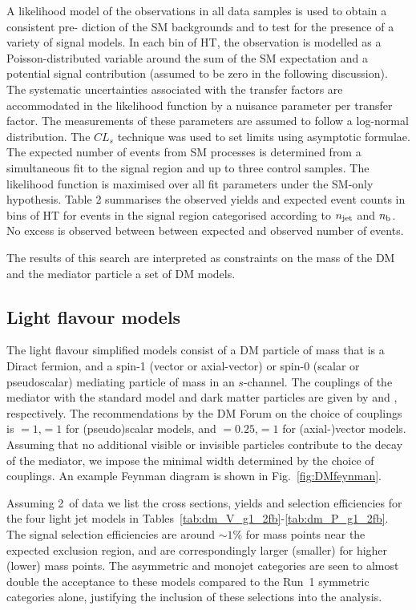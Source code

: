 A likelihood model of the observations in all data samples is used to obtain a consistent pre-
diction of the SM backgrounds and to test for the presence of a variety of signal models.
In each bin of HT, the observation is modelled as a Poisson-distributed variable around the sum
of the SM expectation and a potential signal contribution (assumed to be zero in the following
discussion).  The systematic uncertainties associated with the transfer factors are accommodated 
in the likelihood function by a nuisance parameter per transfer factor. 
The measurements of these parameters are assumed to follow a log-normal
distribution. The $CL_s$ technique was used to set limits using asymptotic formulae.
The expected number of events from SM processes is determined from a simultaneous fit to
the signal region and up to three control samples. The likelihood function is maximised over
all fit parameters under the SM-only hypothesis. Table 2 summarises the observed yields and
expected event counts in bins of HT for events in the signal region categorised according to $n_{\rm jet}$ 
 and $n_{\rm b}$. No excess is observed between between expected and observed number of events.

The results of this search are interpreted as constraints on the mass of the DM and the mediator particle 
a set of DM models.


\subsection{Light flavour models} \label{sec:dm_lightjet}

The light flavour simplified models consist of a DM particle \pchi of mass
\mchi that is a Diract fermion, and a spin-1 (vector or axial-vector) or spin-0
(scalar or pseudoscalar) mediating particle \pphi of mass \mphi in an
$s$-channel. The couplings of the mediator with the standard model and dark
matter particles are given by \gsm and \gdm, respectively. The recommendations
by the DM Forum on the choice of couplings is \gsm$=1$,\gdm$=1$ for
(pseudo)scalar models, and \gsm$=0.25$,\gdm$=1$ for (axial-)vector models.
Assuming that no additional visible or invisible particles contribute to the decay 
of the mediator, we impose the minimal width determined by the choice of couplings. 
An example Feynman diagram is shown in Fig.~\ref{fig:DMfeynman}.

Assuming 2~\ifb of data we list the cross sections, yields and selection 
efficiencies for the four light jet models in
Tables~\ref{tab:dm_V_g1_2fb}-\ref{tab:dm_P_g1_2fb}. The signal selection
efficiencies are around $\sim 1$\% for mass points near the expected exclusion
region, and are correspondingly larger (smaller) for higher (lower) mass points.
The asymmetric and monojet categories are seen to almost double the acceptance
to these models compared to the Run~1 symmetric categories alone, justifying the
inclusion of these selections into the analysis.



